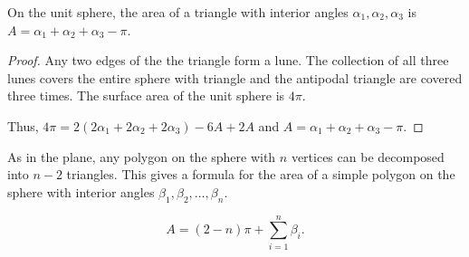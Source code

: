 \begin{lemma}\label{lem:spherical-triangle}
On the unit sphere, the area of a triangle with interior angles $\alpha_1, \alpha_2, \alpha_3$
is $A=\alpha_1+\alpha_2+\alpha_3-\pi$.
\end{lemma}

\begin{proof}
Any two edges of the the triangle form a lune. The collection of 
all three lunes covers the entire sphere with triangle and the antipodal triangle
are covered three times. The surface area of the unit sphere is $4\pi$.

Thus, $4\pi=2(2\alpha_1+2\alpha_2+2\alpha_3)-6A+2A$
and $A=\alpha_1+\alpha_2+\alpha_3-\pi$.
\end{proof}

As in the plane, any polygon on the sphere with $n$ vertices can be decomposed
into $n-2$ triangles. This gives a formula for the area of a simple polygon
on the sphere with interior angles $\beta_1,\beta_2,\ldots, \beta_n$.

\begin{equation} \label{eqn:sphere-area}
A=(2-n)\pi +\sum_{i=1}^n \beta_i.
\end{equation}






